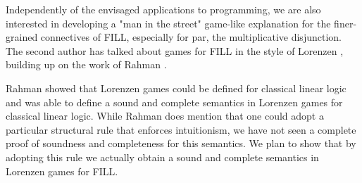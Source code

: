 Independently of the envisaged applications to programming, we are
also interested in developing a "man in the street" game-like
explanation for the finer-grained connectives of FILL, especially for
par, the multiplicative disjunction. The second author has talked
about games for FILL in the style of Lorenzen \cite{dePaiva:2011},
building up on the work of Rahman \cite{Keiff:2011,Rahman:2005}.

Rahman showed that Lorenzen games could be defined for classical
linear logic \cite{Rahman:2002} and was able to define a sound and
complete semantics in Lorenzen games for classical linear logic. While
Rahman does mention that one could adopt a particular structural rule
that enforces intuitionism, we have not seen a complete proof of
soundness and completeness for this semantics.  We plan to show that
by adopting this rule we actually obtain a sound and complete
semantics in Lorenzen games for FILL.








